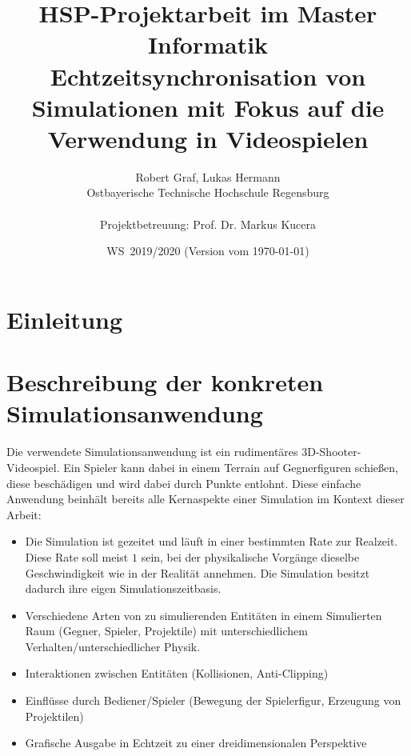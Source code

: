 \documentclass[11pt,twoside,a4paper]{article}
\begin{document}
\title{HSP-Projektarbeit im Master Informatik \\
\small Echtzeitsynchronisation von Simulationen mit Fokus auf die Verwendung in Videospielen}
\author{Robert Graf, Lukas Hermann\\
  Ostbayerische Technische Hochschule Regensburg\\
  \\
  Projektbetreuung: Prof. Dr. Markus Kucera
}
  
\date{WS\, 2019/2020 (Version vom \today)}

\maketitle

\newpage
\tableofcontents
\newpage



\section{Einleitung}


\section{Beschreibung der konkreten Simulationsanwendung}
Die verwendete Simulationsanwendung ist ein rudimentäres 3D-Shooter-Videospiel. Ein Spieler kann dabei in einem Terrain auf Gegnerfiguren schießen, diese beschädigen und wird dabei durch Punkte entlohnt. Diese einfache Anwendung beinhält bereits alle Kernaspekte einer Simulation im Kontext dieser Arbeit:
\begin{itemize}
\item Die Simulation ist gezeitet und läuft in einer bestimmten Rate zur Realzeit. Diese Rate soll meist $1$ sein, bei der physikalische Vorgänge dieselbe Geschwindigkeit wie in der Realität annehmen. Die Simulation besitzt dadurch ihre eigen Simulationszeitbasis.
\item Verschiedene Arten von zu simulierenden Entitäten in einem Simulierten Raum (Gegner, Spieler, Projektile) mit unterschiedlichem Verhalten/unterschiedlicher Physik.
\item Interaktionen zwischen Entitäten (Kollisionen, Anti-Clipping)
\item Einflüsse durch Bediener/Spieler (Bewegung der Spielerfigur, Erzeugung von Projektilen)
\item Grafische Ausgabe in Echtzeit zu einer dreidimensionalen Perspektive
\end{itemize}
\end{document}
